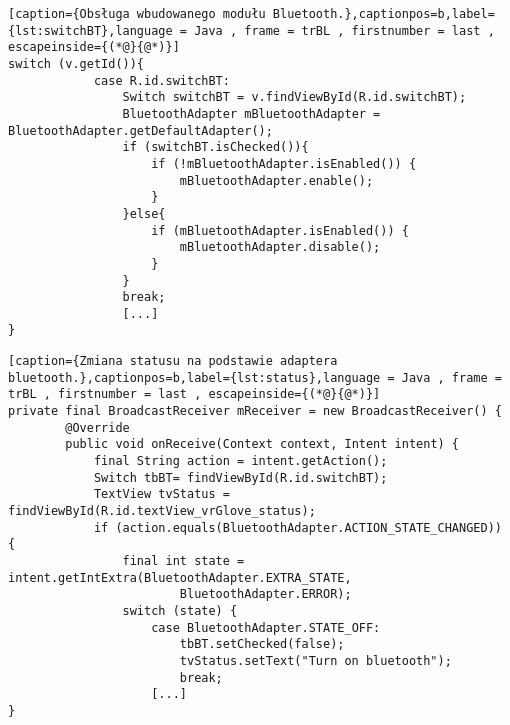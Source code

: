 	\begin{lstlisting}[caption={Obsługa wbudowanego modułu Bluetooth.},captionpos=b,label={lst:switchBT},language = Java , frame = trBL , firstnumber = last , escapeinside={(*@}{@*)}]
switch (v.getId()){
            case R.id.switchBT:
            	Switch switchBT = v.findViewById(R.id.switchBT);
        		BluetoothAdapter mBluetoothAdapter = BluetoothAdapter.getDefaultAdapter();
                if (switchBT.isChecked()){
                    if (!mBluetoothAdapter.isEnabled()) {
                        mBluetoothAdapter.enable();
                    }
                }else{
                    if (mBluetoothAdapter.isEnabled()) {
                        mBluetoothAdapter.disable();
                    }
                }
                break;
                [...]
}
\end{lstlisting}
\begin{lstlisting}[caption={Zmiana statusu na podstawie adaptera bluetooth.},captionpos=b,label={lst:status},language = Java , frame = trBL , firstnumber = last , escapeinside={(*@}{@*)}]
private final BroadcastReceiver mReceiver = new BroadcastReceiver() {
        @Override
        public void onReceive(Context context, Intent intent) {
            final String action = intent.getAction();
            Switch tbBT= findViewById(R.id.switchBT);
            TextView tvStatus = findViewById(R.id.textView_vrGlove_status);
            if (action.equals(BluetoothAdapter.ACTION_STATE_CHANGED)) {
                final int state = intent.getIntExtra(BluetoothAdapter.EXTRA_STATE,
                        BluetoothAdapter.ERROR);
                switch (state) {
                    case BluetoothAdapter.STATE_OFF:
                        tbBT.setChecked(false);
                        tvStatus.setText("Turn on bluetooth");
                        break;
                    [...]
}                    
\end{lstlisting}

